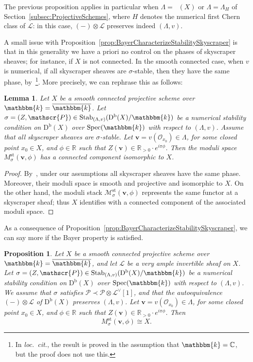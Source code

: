 \documentclass[11pt, reqno]{amsart}
\numberwithin{equation}{section}
\theoremstyle{plain}
\newtheorem{lemma}[theorem]{Lemma}
\newtheorem{proposition}[theorem]{Proposition}
\theoremstyle{remark}
\theoremstyle{definition}
\theoremstyle{italicsname}
\newcommand{\bv}{\mathbf{v}}
\newcommand{\Db}{\mathrm{D^b}}
\newcommand{\num}{\mathrm{num}}
\DeclareMathOperator{\Knum}{\rK_{\num}}
\DeclareMathOperator{\Stab}{Stab}
\DeclareMathOperator{\Spec}{Spec}
\newcommand{\cO}{\mathcal{O}}
\newcommand{\cL}{\mathcal{L}}
\newcommand{\cM}{\mathcal{M}}
\newcommand{\cP}{\mathscr{P}}
\newcommand{\rK}{\mathrm{K}}
\newcommand{\KK}{\mathbbm{k}}
\def\CC{\ensuremath{\mathbb{C}}}
\def\RR{\ensuremath{\mathbb{R}}}
\begin{document}
The previous proposition applies in particular when $\Lambda=\Knum(X)$ or $\Lambda=\Lambda_{H}$ of Section~\ref{subsec:ProjectiveSchemes}, where $H$ denotes the numerical first Chern class of $\cL$: in this case, $(-)\otimes\cL$ preserves indeed $(\Lambda,v)$.

A small issue with Proposition~\ref{prop:BayerCharacterizeStabilitySkyscraper} is that in this generality we have a priori no control on the phases of skyscraper sheaves; for instance, if $X$ is not connected.
In the smooth connected case, when $v$ is numerical, if all skyscraper sheaves are $\sigma$-stable, then they have the same phase, by~\cite[Proposition 2.9]{FLZ:Albanese}\footnote{In \emph{loc.~cit.}, the result is proved in the assumption that $\KK=\CC$, but the proof does not use this.}.
More precisely, we can rephrase this as follows:

\begin{lemma}\label{lem:MptContX}
Let $X$ be a smooth connected projective scheme over $\KK=\overline{\KK}$.
Let $\sigma=(Z,\cP)\in\Stab_{(\Lambda,v)}(\Db(X)/\KK)$ be a numerical stability condition on $\Db(X)$ over $\Spec(\KK)$ with respect to $(\Lambda,v)$.
Assume that all skyscraper sheaves are $\sigma$-stable.
Let $\bv=v(\cO_{x_0})\in\Lambda$, for some closed point $x_0\in X$, and $\phi\in\RR$ such that $Z(\bv)\in\RR_{>0}\cdot e^{i\pi\phi}$.
Then the moduli space $M^{\mathrm{st}}_{\sigma}(\bv,\phi)$ has a connected component isomorphic to $X$.
\end{lemma}

\begin{proof}
By~\cite[Proposition 2.9]{FLZ:Albanese}, under our assumptions all skyscraper sheaves have the same phase.
Moreover, their moduli space is smooth and projective and isomorphic to $X$.
On the other hand, the moduli stack $\cM^{\mathrm{st}}_{\sigma}(\bv,\phi)$ represents the same functor at a skyscraper sheaf; thus $X$ identifies with a connected component of the associated moduli space.
\end{proof}

As a consequence of Proposition~\ref{prop:BayerCharacterizeStabilitySkyscraper}, we can say more if the Bayer property is satisfied.

\begin{proposition}\label{prop:Mpt=X}
Let $X$ be a smooth connected projective scheme over $\KK=\overline{\KK}$, and let $\cL$ be a very ample invertible sheaf on $X$.
Let $\sigma=(Z,\cP)\in\Stab_{(\Lambda,v)}(\Db(X)/\KK)$ be a numerical stability condition on $\Db(X)$ over $\Spec(\KK)$ with respect to $(\Lambda,v)$.
We assume that $\sigma$ satisfies $\cP\prec\cP\otimes\cL^\vee[1]$, and that the autoequivalence $(-)\otimes\cL$ of $\Db(X)$ preserves $(\Lambda,v)$.
Let $\bv=v(\cO_{x_0})\in\Lambda$, for some closed point $x_0\in X$, and $\phi\in\RR$ such that $Z(\bv)\in\RR_{>0}\cdot e^{i\pi\phi}$.
Then
\[
M^{\mathrm{st}}_{\sigma}(\bv,\phi)\cong X.
\]    
\end{proposition}
\end{document}

